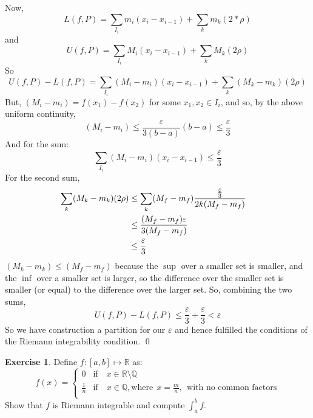 \documentclass[11pt,oneside]{article}
\numberwithin{equation}{section}
\theoremstyle{definition}
\newtheorem{exercise}{Exercise}
\def\RR{\mathbb{R}}
\def\QQ{\mathbb{Q}}
\begin{document}
\begin{solution}
    Now,
    $$ L(f,P) = \sum \limits _ { I_i } m_i (x_i - x_{i-1}) + \sum \limits _k m_k (2 * \rho) $$
    and
    $$ U(f,P) = \sum \limits _ { I_i } M_i (x_i - x_{i-1}) + \sum \limits _k M_k (2 \rho) $$
    So
    $$ U(f,P) - L(f,P) = \sum \limits_{I_i} (M_i - m_i) ( x_i - x_{i-1}) + \sum \limits _k (M_k - m_k) (2 \rho) $$
    But, $ (M_i - m_i) = f(x_1) - f(x_2) $ for some $ x_1, x_2 \in I_i$, and so, by the above uniform continuity,
    $$
    (M_i - m_i) \leq \frac{\varepsilon}{3(b-a)} (b-a) \leq \frac{\varepsilon}{3}
    $$
    And for the sum:
    $$
    \sum \limits_{I_i} (M_i - m_i) (x_i - x_{i-1}) \leq \frac{\varepsilon}{3}
    $$
    For the second sum,
    \begin{align*}
      \sum \limits _k (M_k - m_k) (2 \rho) & \leq \sum \limits _k (M_f - m_f) {\frac{\varepsilon}{3} \over 2k (M_f - m_f)}  & \\
      & \leq \frac{(M_f - m_f) \varepsilon}{3(M_f - m_f)} & \\
      & \leq \frac{\varepsilon}{3}  & \\
    \end{align*}
    $(M_k - m_k) \leq (M_f - m_f)$ because the $\sup$ over a smaller set is smaller, and the $\inf$ over a smaller set is larger,
    so the difference over the smaller set is smaller (or equal) to the difference over the larger set.
    So, combining the two sums,
    $$
    U(f, P) - L(f, P) \leq \frac{\varepsilon}{3} + \frac{\varepsilon}{3} < \varepsilon
    $$
    So we have construction a partition for our $\varepsilon$ and hence fulfilled the conditions of the
    Riemann integrability condition.  \qed
    
    
  
\end{solution}

\begin{exercise}
  Define $f : [a,b ] \mapsto \RR $ as:
  $$
  f(x) = \begin{cases}
    0 & \text{if} \quad x \in \RR \setminus \QQ \\
    \frac{1}{n} & \text{if} \quad x \in \QQ, \text{where}\ \  x = \frac{m}{n}, \ \ 
    \text{with no common factors} \\
  \end{cases}
  $$
  Show that $f$ is Riemann integrable and compute $\int _ {a} ^ {b} f$.  
\end{exercise}
\end{document}
